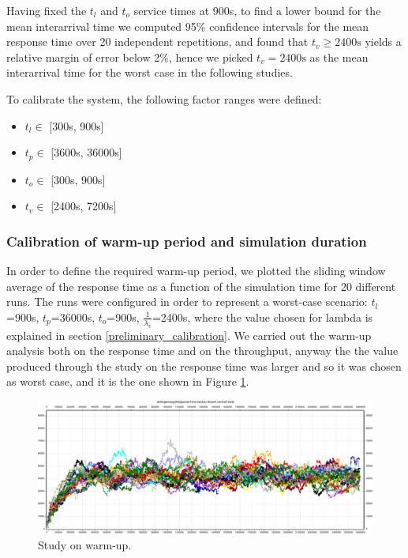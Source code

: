\documentclass[12pt]{article}
\begin{document}
Having fixed the $t_l$ and $t_o$ service times at 900s, to find a lower bound for the mean interarrival time we computed 95\% confidence intervals for the mean response time over 20 independent repetitions, and found that $t_v \geq 2400\text{s}$ yields a relative margin of error below 2\%, hence we picked $t_v = 2400\text{s}$ as the mean interarrival time for the worst case in the following studies.

To calibrate the system, the following factor ranges were defined:
\begin{itemize}
    \item $t_l \in$ [300s, 900s]
    \item $t_p \in$ [3600s, 36000s]
    \item $t_o \in$ [300s, 900s]
    \item  $t_v \in$ [2400s, 7200s]
\end{itemize}


\subsubsection{Calibration of warm-up period and simulation duration}
In order to define the required warm-up period, we plotted the sliding window average of the response time as a function of the simulation time for 20 different runs. The runs were configured in order to represent a worst-case scenario: $t_l$=900s, $t_p$=36000s, $t_o$=900s,  $\frac{1}{\lambda_v}$=2400s, where the value chosen for lambda is explained in section \ref{preliminary_calibration}.
We carried out the warm-up analysis both on the response time and on the throughput, anyway the the value produced through the study on the response time was larger and so it was chosen as worst case, and it is the one shown in Figure \ref{warm_up_analysis}.

\begin{figure}[H]
	\centering
	\includegraphics[width=.8\textwidth]{report/immagini/exponential-warmup}
	\caption{Study on warm-up.}\label{warm_up_analysis}
\end{figure}
\end{document}

